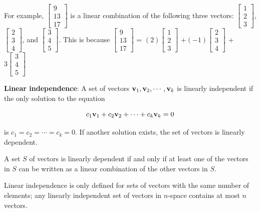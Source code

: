 \documentclass[
  letterpaper,
]{book}
\theoremstyle{definition}
\theoremstyle{definition}
\theoremstyle{plain}
\theoremstyle{definition}
\theoremstyle{plain}
\theoremstyle{plain}
\theoremstyle{remark}
\begin{document}
For example, \(\begin{bmatrix}9 \\ 13 \\ 17 \end{bmatrix}\) is a linear
combination of the following three vectors:
\(\begin{bmatrix}1 \\ 2 \\ 3 \end{bmatrix}\),
\(\begin{bmatrix} 2 \\ 3\\ 4\end{bmatrix}\), and
\(\begin{bmatrix} 3 \\ 4 \\ 5 \end{bmatrix}\). This is because
\(\begin{bmatrix}9 \\ 13 \\ 17 \end{bmatrix}\) =
\((2)\begin{bmatrix}1 \\ 2 \\ 3 \end{bmatrix}\)
\(+ (-1)\begin{bmatrix} 2 \\ 3\\ 4\end{bmatrix}\) +
\(3\begin{bmatrix} 3 \\ 4 \\ 5 \end{bmatrix}\)

\textbf{Linear independence}: A set of vectors
\({\bf v}_1, {\bf v}_2, \cdots , {\bf v}_k\) is linearly independent if
the only solution to the equation

\[c_1{\bf v}_1 + c_2{\bf v}_2 +  \cdots + c_k{\bf v}_k = 0\]

is \(c_1 = c_2 = \cdots = c_k = 0\). If another solution exists, the set
of vectors is linearly dependent.

A set \(S\) of vectors is linearly dependent if and only if at least one
of the vectors in \(S\) can be written as a linear combination of the
other vectors in \(S\).

Linear independence is only defined for sets of vectors with the same
number of elements; any linearly independent set of vectors in
\(n\)-space contains at most \(n\) vectors.
\end{document}
